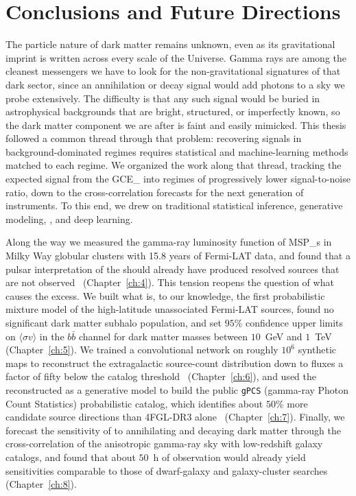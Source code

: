 \chapter*{Conclusions and Future Directions}
\label{chap:outlook}
\glsresetall

The particle nature of dark matter remains unknown, even as its
gravitational imprint is written across every scale of the Universe. Gamma
rays are among the cleanest messengers we have to look for the non-gravitational
signatures of that dark sector, since an annihilation or decay signal would
add photons to a sky we probe extensively.
The difficulty is that any such signal would be buried in astrophysical
backgrounds that are bright, structured, or imperfectly known, so the dark
matter component we are after is faint and easily mimicked.
This thesis followed a common thread through that problem: recovering signals in
background-dominated regimes requires statistical
and machine-learning methods matched to each regime. We organized the work along
that thread, tracking the expected signal from the \gls{GCE_} into
regimes of progressively lower signal-to-noise ratio, down to the cross-correlation forecasts for
the next generation of instruments. To this end, we drew on traditional
statistical inference, generative modeling, \SBI, and deep
learning.

Along the way we measured the gamma-ray luminosity function of \glspl{MSP_}
in Milky Way globular clusters with 15.8 years of Fermi-LAT data, and
found that a pulsar interpretation of the \GCE should already
have produced resolved sources that are not observed~\cite{Amerio:2024qor}
(Chapter~\ref{ch:4}). This tension reopens the question of what causes the
excess. We built what is, to our knowledge, the first
probabilistic mixture model of the high-latitude unassociated Fermi-LAT
sources, found no significant dark matter subhalo population, and set $95\%$
confidence upper limits on $\langle\sigma v\rangle$ in the $b\bar{b}$ channel
for dark matter masses between $10$~GeV and $1$~TeV~\cite{Amerio:2025fhz}
(Chapter~\ref{ch:5}). We trained a convolutional network on roughly $10^{6}$
synthetic maps to reconstruct the extragalactic source-count distribution
\dnds{} down to fluxes a factor of fifty below the catalog
threshold~\cite{Amerio:2023uet} (Chapter~\ref{ch:6}), and used the
reconstructed \dnds{} as a generative model to build the public \texttt{gPCS}
(gamma-ray Photon Count Statistics) probabilistic catalog, which identifies
about $50\%$ more candidate source directions than 4FGL-DR3
alone~\cite{Amerio:2023rjn} (Chapter~\ref{ch:7}). Finally, we forecast the
sensitivity of \CTAO to annihilating and decaying dark matter through the
cross-correlation of the anisotropic gamma-ray sky with low-redshift galaxy
catalogs, and found that about $50$~h of observation would already yield
sensitivities comparable to those of dwarf-galaxy and galaxy-cluster
searches~\cite{Pinetti:2025hgd} (Chapter~\ref{ch:8}).


